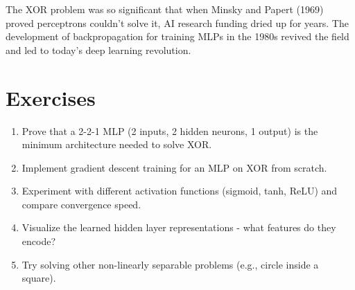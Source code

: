 \documentclass{article}
\begin{document}
\begin{tcolorbox}[colback=green!5!white, colframe=green!50!black, title=Historical Note]
The XOR problem was so significant that when Minsky and Papert (1969) proved perceptrons couldn't solve it, AI research funding dried up for years. The development of backpropagation for training MLPs in the 1980s revived the field and led to today's deep learning revolution.
\end{tcolorbox}

\section{Exercises}

\begin{enumerate}
    \item Prove that a 2-2-1 MLP (2 inputs, 2 hidden neurons, 1 output) is the minimum architecture needed to solve XOR.
    \item Implement gradient descent training for an MLP on XOR from scratch.
    \item Experiment with different activation functions (sigmoid, tanh, ReLU) and compare convergence speed.
    \item Visualize the learned hidden layer representations - what features do they encode?
    \item Try solving other non-linearly separable problems (e.g., circle inside a square).
\end{enumerate}
\end{document}
